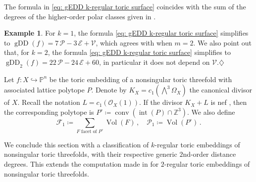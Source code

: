 \documentclass[11pt,reqno]{amsart}
\numberwithin{equation}{section}
\theoremstyle{plain}
\numberwithin{theorem}{section}
\theoremstyle{definition}
\newtheorem{example}[theorem]{Example}
\renewcommand{\P}{\mathbb{P}}
\newcommand{\Z}{\mathbb{Z}}
\newcommand{\VV}{\mathcal{V}}
\newcommand{\EE}{\mathcal{E}}
\newcommand{\FF}{\mathcal{F}}
\newcommand{\OO}{\mathcal{O}}
\newcommand{\PP}{\mathcal{P}}
\newcommand{\conv}{\operatorname{conv}}
\newcommand{\gDD}{\operatorname{gDD}}
\newcommand{\Vol}{\operatorname{Vol}}
\begin{document}
The formula in \eqref{eq: gEDD k-regular toric surface} coincides with the sum of the degrees of the higher-order polar classes given in \cite[Example 8.2]{piene2022higher}.

\begin{example}
For $k=1$, the formula \eqref{eq: gEDD k-regular toric surface} simplifies to $\gDD(f)=7\,\PP-3\,\EE+\VV$, which agrees with \cite[Corollary 5.11]{DHOST} when $m=2$. We also point out that, for $k=2$, the formula \eqref{eq: gEDD k-regular toric surface} simplifies to $\gDD_2(f) = 22\,\PP-24\,\EE+60$, in particular it does not depend on $\VV$.\hfill$\diamondsuit$
\end{example}

Let $f\colon X\hookrightarrow\P^n$ be the toric embedding of a nonsingular toric threefold with associated lattice polytope $P$. Denote by $K_X=c_1(\bigwedge^3\Omega_X)$ the canonical divisor of $X$. Recall the notation $L=c_1(\OO_X(1))$. If the divisor $K_X+L$ is nef \cite[Definition 1.4.1]{lazarsfeld2017positivity}, then the corresponding polytope is $P^\circ\coloneqq\conv(\operatorname{int}(P)\cap\Z^3)$. We also define
\[
\FF_1\coloneqq \sum_{\text{$F$ facet of $P^\circ$}}\Vol(F)\,,\quad\PP_1\coloneqq\Vol(P^\circ)\,.
\]

We conclude this section with a classification of $k$-regular toric embeddings of nonsingular toric threefolds, with their respective generic $2$nd-order distance degrees. This extends the computation made in \cite[Example 8.3]{piene2022higher} for $2$-regular toric embeddings of nonsingular toric threefolds.
\end{document}
